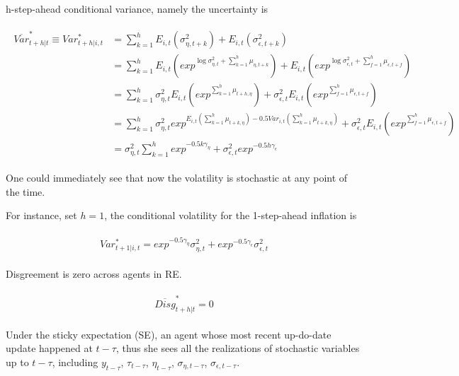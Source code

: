 \documentclass[12pt]{article}
\begin{document}
	
	
	h-step-ahead conditional variance, namely the uncertainty is
	
	\begin{eqnarray}
	\begin{split}
	\overline{Var}^*_{t+h|t} \equiv  Var^*_{t+h|i,t} & = \sum^{h}_{k=1} E_{i,t}(\sigma^2_{\eta,t+k}) +  E_{i,t}(\sigma^2_{\epsilon,t+k})  \\
	& = \sum^{h}_{k=1} E_{i,t}(exp^{\log \sigma^2_{\eta,t}+\sum^h_{k=1}\mu_{\eta,t+k}}) +  E_{i,t}(exp^{\log \sigma^2_{\epsilon,t}+\sum^h_{f=1}\mu_{\epsilon,t+f}} ) \\
	& = \sum^{h}_{k=1}\sigma^2_{\eta,t} E_{i,t}(exp^{\sum^h_{k=1}\mu_{t+h,\eta}}) +  \sigma^2_{\epsilon,t} E_{i,t}(exp^{\sum^h_{f=1}\mu_{\epsilon,t+f}} ) \\
	& = \sum^{h}_{k=1}\sigma^2_{\eta,t}  exp^{E_{i,t}({\sum^h_{k=1}\mu_{t+k,\eta}})- 0.5Var_{i,t}(\sum^h_{k=1}\mu_{t+k,\eta})} +  \sigma^2_{\epsilon,t} E_{i,t}(exp^{\sum^h_{f=1}\mu_{\epsilon,t+f}} ) \\
	& = \sigma^2_{\eta,t} \sum^{h}_{k=1} exp^{- 0.5k\gamma_{\eta}} +  \sigma^2_{\epsilon,t} exp^{- 0.5h\gamma_{\epsilon}} 
	\end{split} 
	\end{eqnarray}
	
	One could immediately see that now the volatility is stochastic at any point of the time. 
	
	For instance, set $h=1$, the conditional volatility for the 1-step-ahead inflation is 
	
	\begin{eqnarray}
	\begin{split}
	Var^*_{t+1|i,t} =  exp^{- 0.5\gamma_{\eta}} \sigma^2_{\eta,t}  +  exp^{- 0.5\gamma_{\epsilon}} \sigma^2_{\epsilon,t} 
	\end{split} 
	\end{eqnarray}
	
	Disgreement is zero across agents in RE.
	
	
	\begin{eqnarray}
	\begin{split}
	\overline{Disg}^*_{t+h|t} =  0 
	\end{split} 
	\end{eqnarray}
	
	Under the sticky expectation (SE), an agent whose most recent up-do-date update happened at $t-\tau$, thus she sees all the realizations of stochastic variables up to $t-\tau$, including $y_{t-\tau}$, $\tau_{t-\tau}$, $\eta_{t-\tau}$, $\sigma_{\eta,t-\tau}$, $\sigma_{\epsilon,t-\tau}$. 
	
\end{document}
